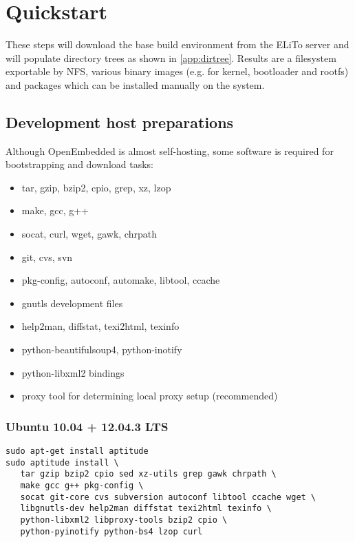 \chapter{Quickstart}
\label{chap:quickstart}

These steps will download the base build environment from the ELiTo
server and will populate directory trees as shown in
\autoref{app:dirtree}. Results are a filesystem exportable by NFS,
various binary images (e.g. for kernel, bootloader and rootfs) and
packages which can be installed manually on the system.

\section{Development host preparations}

Although OpenEmbedded is almost self-hosting, some software is
required for bootstrapping and download tasks:

\begin{itemize}
\item tar, gzip, bzip2, cpio, grep, xz, lzop
\item make, gcc, g++
\item socat, curl, wget, gawk, chrpath
\item git, cvs, svn
\item pkg-config, autoconf, automake, libtool, ccache
\item gnutls development files
\item help2man, diffstat, texi2html, texinfo
\item python-beautifulsoup4, python-inotify
\item python-libxml2 bindings
\item proxy tool for determining local proxy setup (recommended)
\end{itemize}

\subsection*{Ubuntu 10.04 + 12.04.3 LTS}
\begin{lstlisting}[language={}]
sudo apt-get install aptitude
sudo aptitude install \
   tar gzip bzip2 cpio sed xz-utils grep gawk chrpath \
   make gcc g++ pkg-config \
   socat git-core cvs subversion autoconf libtool ccache wget \
   libgnutls-dev help2man diffstat texi2html texinfo \
   python-libxml2 libproxy-tools bzip2 cpio \
   python-pyinotify python-bs4 lzop curl
\end{lstlisting}


